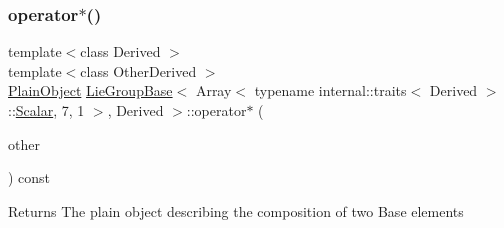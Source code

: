 \subsubsection{\texorpdfstring{operator$\ast$()}{operator*()}\hspace{0.1cm}{\footnotesize\ttfamily [1/4]}}
{\footnotesize\ttfamily template$<$class Derived $>$ \\
template$<$class Other\+Derived $>$ \\
\hyperlink{class_lie_group_base_3_01_array_3_01typename_01internal_1_1traits_3_01_derived_01_4_1_1_scalar_0d6d4b5459662fc32c7117aee50362fb1_a950a48c9e027bcd00193aa20a59ee723}{Plain\+Object} \hyperlink{class_lie_group_base}{Lie\+Group\+Base}$<$ Array$<$ typename internal\+::traits$<$ Derived $>$\+::\hyperlink{class_lie_group_base_3_01_array_3_01typename_01internal_1_1traits_3_01_derived_01_4_1_1_scalar_0d6d4b5459662fc32c7117aee50362fb1_a831695c575380c9a1df32eff9fc4a8c6}{Scalar}, 7, 1 $>$, Derived $>$\+::operator$\ast$ (\begin{DoxyParamCaption}\item[{const \hyperlink{class_lie_group_base}{Lie\+Group\+Base}$<$ \hyperlink{class_lie_group_base_3_01_array_3_01typename_01internal_1_1traits_3_01_derived_01_4_1_1_scalar_0d6d4b5459662fc32c7117aee50362fb1_aadee14149cfa071338ac1f64e23c283d}{Base\+Type}, Other\+Derived $>$ \&}]{other }\end{DoxyParamCaption}) const\hspace{0.3cm}{\ttfamily [inline]}}

\begin{DoxyReturn}{Returns}
The plain object describing the composition of two Base elements 
\end{DoxyReturn}
\hypertarget{class_lie_group_base_3_01_array_3_01typename_01internal_1_1traits_3_01_derived_01_4_1_1_scalar_0d6d4b5459662fc32c7117aee50362fb1_a4c0458408f7b6df1bc6ca8a5d0704983}{}\label{class_lie_group_base_3_01_array_3_01typename_01internal_1_1traits_3_01_derived_01_4_1_1_scalar_0d6d4b5459662fc32c7117aee50362fb1_a4c0458408f7b6df1bc6ca8a5d0704983} 
